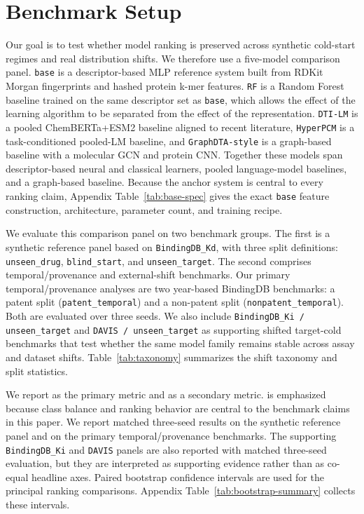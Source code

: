 \section{Benchmark Setup}

Our goal is to test whether model ranking is preserved across synthetic cold-start regimes and real distribution shifts. We therefore use a five-model comparison panel. \texttt{base} is a descriptor-based MLP reference system built from RDKit Morgan fingerprints and hashed protein k-mer features. \texttt{RF} is a Random Forest baseline trained on the same descriptor set as \texttt{base}, which allows the effect of the learning algorithm to be separated from the effect of the representation. \texttt{DTI-LM} is a pooled ChemBERTa+ESM2 baseline aligned to recent literature, \texttt{HyperPCM} is a task-conditioned pooled-LM baseline, and \texttt{GraphDTA-style} is a graph-based baseline with a molecular GCN and protein CNN. Together these models span descriptor-based neural and classical learners, pooled language-model baselines, and a graph-based baseline. Because the anchor system is central to every ranking claim, Appendix Table~\ref{tab:base-spec} gives the exact \texttt{base} feature construction, architecture, parameter count, and training recipe.

We evaluate this comparison panel on two benchmark groups. The first is a synthetic reference panel based on \texttt{BindingDB\_Kd}, with three split definitions: \texttt{unseen\_drug}, \texttt{blind\_start}, and \texttt{unseen\_target}. The second comprises temporal/provenance and external-shift benchmarks. Our primary temporal/provenance analyses are two year-based BindingDB benchmarks: a patent split (\texttt{patent\_temporal}) and a non-patent split (\texttt{nonpatent\_temporal}). Both are evaluated over three seeds. We also include \texttt{BindingDB\_Ki / unseen\_target} and \texttt{DAVIS / unseen\_target} as supporting shifted target-cold benchmarks that test whether the same model family remains stable across assay and dataset shifts. Table~\ref{tab:taxonomy} summarizes the shift taxonomy and split statistics.



We report \AUPRC{} as the primary metric and \AUROC{} as a secondary metric. \AUPRC{} is emphasized because class balance and ranking behavior are central to the benchmark claims in this paper. We report matched three-seed results on the synthetic reference panel and on the primary temporal/provenance benchmarks. The supporting \texttt{BindingDB\_Ki} and \texttt{DAVIS} panels are also reported with matched three-seed evaluation, but they are interpreted as supporting evidence rather than as co-equal headline axes. Paired bootstrap confidence intervals are used for the principal ranking comparisons. Appendix Table~\ref{tab:bootstrap-summary} collects these intervals.

